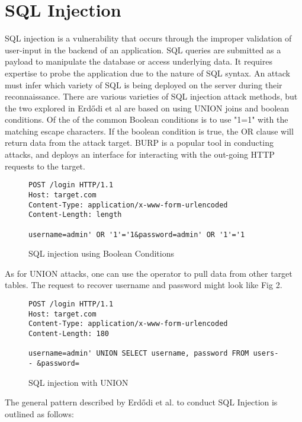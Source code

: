 \documentclass[conference]{IEEEtran}
\begin{document}
\section{SQL Injection}
SQL injection is a vulnerability that occurs through the improper validation of user-input in the backend of an application. SQL queries are submitted as a payload to manipulate the database or access underlying data. It requires expertise to probe the application due to the nature of SQL syntax. An attack must infer which variety of SQL is being deployed on the server during their reconnaissance. There are various varieties of SQL injection attack methods, but the two explored in Erdődi et al are based on using UNION joins and boolean conditions. Of the of the common Boolean conditions is to use "1=1" with the matching escape characters. If the boolean condition is true, the OR clause will return data from the attack target. BURP is a popular tool in conducting attacks, and deploys an interface for interacting with the out-going HTTP requests to the target.

\begin{figure}[ht]
\begin{lstlisting}
POST /login HTTP/1.1
Host: target.com
Content-Type: application/x-www-form-urlencoded
Content-Length: length

username=admin' OR '1'='1&password=admin' OR '1'='1

\end{lstlisting}
\caption{SQL injection using Boolean Conditions}
\label{fig:booleanrequest}
\end{figure}

As for UNION attacks, one can use the operator to pull data from other target tables. The request to recover username and password might look like Fig 2. 

\begin{figure}[ht]
\begin{lstlisting}
POST /login HTTP/1.1
Host: target.com
Content-Type: application/x-www-form-urlencoded
Content-Length: 180

username=admin' UNION SELECT username, password FROM users-- &password=

\end{lstlisting}
\caption{SQL injection with UNION}
\label{fig:unionrequest}
\end{figure}

\noindent The general pattern described by Erd\H{o}di et al. to conduct SQL Injection is outlined as follows:
\end{document}
